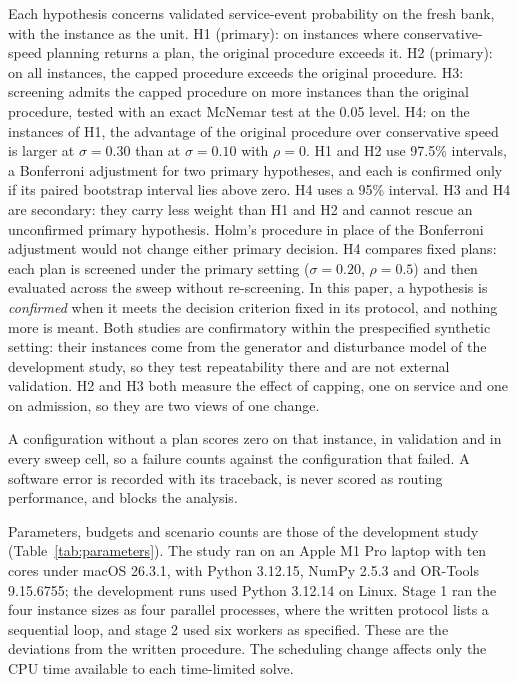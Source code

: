 \documentclass[11pt,a4paper]{article}
\begin{document}
Each hypothesis concerns validated service-event probability on the fresh bank,
with the instance as the unit. H1 (primary): on instances where
conservative-speed planning returns a plan, the original procedure exceeds it.
H2 (primary): on all instances, the capped procedure exceeds the original
procedure. H3: screening admits the capped procedure on more instances than the
original procedure, tested with an exact McNemar test at the 0.05 level. H4: on
the instances of H1, the advantage of the original procedure over conservative
speed is larger at $\sigma=0.30$ than at $\sigma=0.10$ with $\rho=0$. H1 and H2
use 97.5\% intervals, a Bonferroni adjustment for two primary hypotheses, and
each is confirmed only if its paired bootstrap interval lies above zero. H4 uses
a 95\% interval. H3 and H4 are secondary: they carry less weight than H1 and H2
and cannot rescue an unconfirmed primary hypothesis. Holm's procedure in place
of the Bonferroni adjustment would not change either primary decision. H4
compares fixed plans: each plan is screened under the primary setting
($\sigma=0.20$, $\rho=0.5$) and then evaluated across the sweep without
re-screening. In this paper, a hypothesis is \emph{confirmed} when it meets the
decision criterion fixed in its protocol, and nothing more is meant. Both
studies are confirmatory within the prespecified synthetic setting: their
instances come from the generator and disturbance model of the development
study, so they test repeatability there and are not external validation. H2
and H3 both measure the effect of capping, one on service and one on admission,
so they are two views of one change.

A configuration without a plan scores zero on that instance, in validation and
in every sweep cell, so a failure counts against the configuration that failed.
A software error is recorded with its traceback, is never scored as routing
performance, and blocks the analysis.

Parameters, budgets and scenario counts are those of the development study
(Table~\ref{tab:parameters}). The study ran on an Apple M1 Pro laptop with ten
cores under macOS 26.3.1, with Python 3.12.15, NumPy 2.5.3 and OR-Tools
9.15.6755; the development runs used Python 3.12.14 on Linux. Stage 1 ran the
four instance sizes as four parallel processes, where the written protocol lists
a sequential loop, and stage 2 used six workers as specified. These are the
deviations from the written procedure. The scheduling change affects only the CPU
time available to each time-limited solve.
\end{document}

